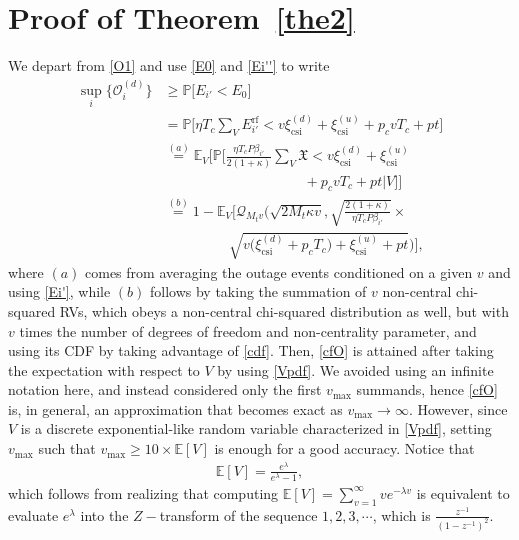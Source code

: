 \documentclass[10pt,journal,a4paper]{IEEEtran}
\begin{document}
	\section{Proof of Theorem~\ref{the2}}\label{App_A}
	We depart from \eqref{O1} and use \eqref{E0} and \eqref{Ei''} to write
	\begin{align}
	\sup_i\{\mathcal{O}_i^{(d)}\}&\ge \mathbb{P}\big[E_{i'}<E_0\big]\nonumber\\
	&=\mathbb{P}\Big[\eta T_c\!\sum_V\! E_{i'}^\mathrm{rf}\!<\!v\xi_\mathrm{csi}^{(d)}\!+\!\xi_\mathrm{csi}^{(u)}\!+\!p_c vT_c\!+\!p t\Big]\nonumber\\
	&\stackrel{(a)}{=}\mathbb{E}_V\bigg[\mathbb{P}\Big[\frac{\eta T_c P\beta_{i'}}{2(1+\kappa)}\sum_V \mathfrak{X}<v\xi_\mathrm{csi}^{(d)}+\xi_\mathrm{csi}^{(u)}\nonumber\\
	&\qquad\qquad\qquad\qquad\qquad+p_c vT_c+p t\Big|V\Big]\bigg]\nonumber\\
	&\stackrel{(b)}{=}1-\mathbb{E}_V\bigg[\mathcal{Q}_{M_t v}\Big(\sqrt{2M_t\kappa v},\sqrt{\frac{2(1+\kappa)}{\eta T_c P\beta_{i'}}}\times\nonumber\\
	&\qquad\qquad\ \ \  \sqrt{v\big(\xi_\mathrm{csi}^{(d)}+p_cT_c\big)\!+\!\xi_\mathrm{csi}^{(u)}\!+\!p t}\Big)\bigg],
	\end{align}
	where $(a)$ comes from averaging the outage events conditioned on a given $v$ and  using \eqref{Ei'}, while $(b)$ follows by taking the summation of $v$ non-central chi-squared RVs, which obeys a non-central chi-squared distribution as well, but with $v$ times the number of degrees of freedom and non-centrality parameter, and using its CDF by taking advantage of \eqref{cdf}.
	Then, \eqref{cfO} is attained  after taking the expectation with respect to $V$ by using \eqref{Vpdf}. We avoided using an infinite notation here, and instead considered only the first $v_{\max}$ summands, hence \eqref{cfO} is, in general, an approximation that becomes exact as $v_{\max}\rightarrow\infty$. However,
	since $V$ is a discrete exponential-like random variable characterized in \eqref{Vpdf}, setting $v_{\max}$ such that $v_{\max}\ge 10\times \mathbb{E}[V]$ is enough for a good accuracy. Notice that
	\begin{align}
	\mathbb{E}[V]=\frac{e^\lambda}{e^\lambda-1},\label{Ev}
	\end{align}
	which follows from realizing that computing $\mathbb{E}[V]=\sum_{v=1}^{\infty}ve^{-\lambda v}$ is equivalent to evaluate  $e^{\lambda}$ into the $Z-$transform of the sequence $1,2,3,\cdots$, which is $\frac{z^{-1}}{(1-z^{-1})^2}$. \hfill 	\qedsymbol
\end{document}
